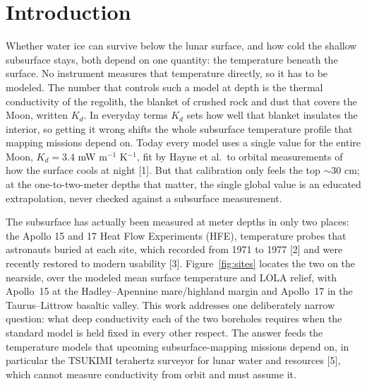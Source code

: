 \documentclass[10pt,a4paper,twocolumn]{article}
\begin{document}

\section{Introduction}
Whether water ice can survive below the lunar surface, and how cold the
shallow subsurface stays, both depend on one quantity: the temperature
beneath the surface. No instrument measures that temperature directly,
so it has to be modeled. The number that controls such a model at depth is
the thermal conductivity of the regolith, the blanket of crushed rock
and dust that covers the Moon, written $K_d$. In everyday terms $K_d$
sets how well that blanket insulates the interior, so getting it wrong
shifts the whole subsurface temperature profile that mapping missions
depend on. Today every model uses a single value for the entire Moon,
$K_d = 3.4$ mW m$^{-1}$ K$^{-1}$, fit by Hayne et al.\ to orbital
measurements of how the surface cools at night [1]. But that
calibration only feels the top ${\sim}30$ cm; at the one-to-two-meter
depths that matter, the single global value is an educated
extrapolation, never checked against a subsurface measurement.

The subsurface has actually been measured at meter depths in only two
places: the Apollo 15 and 17 Heat Flow Experiments (HFE), temperature
probes that astronauts buried at each site, which recorded from 1971 to
1977 [2] and were recently restored to modern usability [3].
Figure~\ref{fig:sites} locates the two on the nearside, over the modeled
mean surface temperature and LOLA relief, with Apollo~15 at the
Hadley--Apennine mare/highland margin and Apollo~17 in the
Taurus--Littrow basaltic valley. This work addresses one deliberately
narrow question: what deep conductivity each of the two boreholes
requires when the standard model is held fixed in every other respect.
The answer feeds the temperature models that upcoming subsurface-mapping
missions depend on, in particular the TSUKIMI terahertz surveyor for
lunar water and resources [5], which cannot measure conductivity from
orbit and must assume it.
\end{document}
